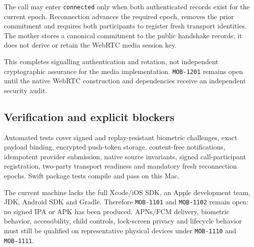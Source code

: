 The call may enter \texttt{connected} only when both authenticated records exist for
the current epoch.  Reconnection advances the required epoch, removes the prior
commitment and requires both participants to register fresh transport identities.
The mother stores a canonical commitment to the public handshake records; it does not
derive or retain the WebRTC media session key.

This completes signalling authentication and rotation, not independent cryptographic
assurance for the media implementation.  \texttt{MOB-1201} remains open until the
native WebRTC construction and dependencies receive an independent security audit.

\subsection{Verification and explicit blockers}

Automated tests cover signed and replay-resistant biometric challenges, exact payload
binding, encrypted push-token storage, content-free notifications, idempotent provider
submission, native source invariants, signed call-participant registration, two-party
transport readiness and mandatory fresh reconnection epochs.  Swift package tests
compile and pass on this Mac.

The current machine lacks the full Xcode/iOS SDK, an Apple development team, JDK,
Android SDK and Gradle.  Therefore \texttt{MOB-1101} and \texttt{MOB-1102} remain open:
no signed IPA or APK has been produced.  APNs/FCM delivery, biometric behavior,
accessibility, child controls, lock-screen privacy and lifecycle behavior must still
be qualified on representative physical devices under \texttt{MOB-1110} and
\texttt{MOB-1111}.
